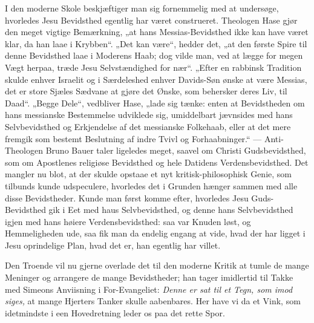 \documentclass[12pt,a4paper]{book}
\begin{document}
I den moderne Skole beskjæftiger man sig fornemmelig med at undersøge, hvorledes
Jesu Bevidsthed egentlig har været construeret. Theologen Hase gjør den meget
vigtige Bemærkning, „at hans Messias-Bevidsthed ikke kan have været klar, da han
laae i Krybben“. „Det kan være“, hedder det, „at den første Spire til denne
Bevidsthed laae i Moderens Haab; dog vilde man, ved at lægge for megen Vægt
herpaa, træde Jesu Selvstændighed for nær“. „Efter en rabbinsk Tradition skulde
enhver Israelit og i Særdeleshed enhver Davids-Søn ønske at være Messias, det er
store Sjæles Sædvane at gjøre det Ønske, som behersker deres Liv, til Daad“.
„Begge Dele“, vedbliver Hase, „lade sig tænke: enten at Bevidstheden om hans
messianske Bestemmelse udviklede sig, umiddelbart jævnsides med hans
Selvbevidsthed og Erkjendelse af det messianske Folkehaab, eller at det mere
fremgik som bestemt Beslutning af indre Tvivl og Forhaabninger.“ ---
Anti-Theologen Bruno Bauer taler ligeledes meget, saavel om Christi
Gudsbevidsthed, som om Apostlenes religiøse Bevidsthed og hele Datidens
Verdensbevidsthed. Det mangler nu blot, at der skulde opstaae et nyt
kritisk-philosophisk Genie, som tilbunds kunde udspeculere, hvorledes det i
Grunden hænger sammen med alle disse Bevidstheder. Kunde man først komme efter,
hvorledes Jesu Guds-Bevidsthed gik i Eet med haus Selvbevidsthed, og denne hans
Selvbevidsthed igjen med hans høiere Verdensbevidsthed: saa var Knuden løst, og
Hemmeligheden ude, saa fik man da endelig engang at vide, hvad der har ligget i
Jesu oprindelige Plan, hvad det er, han egentlig har villet.

Den Troende vil nu gjerne overlade det til den moderne Kritik at tumle de mange
Meninger og arrangere de mange Bevidstheder; han tager imidlertid til Takke med
Simeons Anviisning i For-Evangeliet: \emph{Denne er sat til et Tegn, som imod\-%
siges,} {\large at mange Hjerters Tanker skulle aabenbares.}
Her have vi da et Vink, som idetmindste i een Hovedretning leder os paa det
rette Spor.
\end{document}
